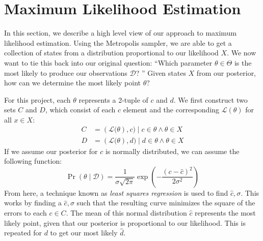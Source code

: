 \section{Maximum Likelihood Estimation}\label{sec:maximumLikelihoodEstimation}
In this section, we describe a high level view of our approach to maximum likelihood estimation.
Using the Metropolis sampler, we are able to get a collection of states from a distribution proportional to our
likelihood $X$.
We now want to tie this back into our original question: ``Which parameter $\theta \in \Theta$ is the most likely to
produce our observations $\mathcal{D}$? ''
Given states $X$ from our posterior, how can we determine the most likely point $\theta$?

For this project, each $\theta$ represents a 2-tuple of $c$ and $d$.
We first construct two sets $C$ and $D$, which consist of each $c$ element and the corresponding $\mathcal{L}(\theta)$
for all $x \in X$:
\begin{equation}
    \begin{aligned}
        C &= \left(\mathcal{L}(\theta\right), c) \mid c \in \theta \land \theta \in X \\
        D &= \left(\mathcal{L}(\theta\right), d) \mid d \in \theta \land \theta \in X
    \end{aligned}
\end{equation}
If we assume our posterior for $c$ is normally distributed, we can assume the following function:
\begin{equation}
    \Pr(\theta \mid \mathcal{D}) = \frac{1}{\sigma\sqrt{2\pi}}\exp\left( -\frac{(c - \hat{c})^2}{2\sigma^2} \right)
\end{equation}
From here, a technique known as \emph{least squares regression} is used to find $\hat{c}, \sigma$.
This works by finding a $\hat{c}, \sigma$ such that the resulting curve minimizes the square of the errors to each
$c \in C$.
The mean of this normal distribution $\hat{c}$ represents the most likely point, given that our posterior is
proportional to our likelihood.
This is repeated for $d$ to get our most likely $\hat{d}$.
